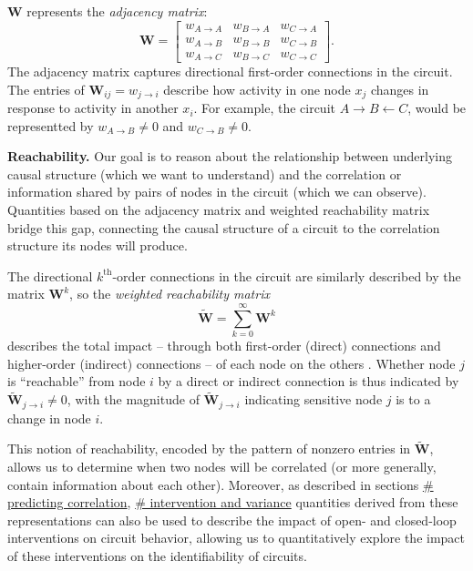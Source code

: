 \documentclass{article}
\begin{document}
\(\mathbf{W}\) represents the \emph{adjacency matrix}: \[
\mathbf{W} = \begin{bmatrix}
    w_{A→A} & w_{B→A} & w_{C→A} \\
    w_{A→B} & w_{B→B} & w_{C→B} \\
    w_{A→C} & w_{B→C} & w_{C→C}
\end{bmatrix}.
\] The adjacency matrix captures directional first-order connections in the circuit. The entries of \(\mathbf{W}_{ij} = w_{j→i}\) describe how activity in one node \(x_j\) changes in response to activity in another
\(x_i\). For example, the circuit \(A \rightarrow B \leftarrow C\), would be representted by \(w_{A→B} \neq 0\) and \(w_{C→B} \neq 0\).

\textbf{Reachability.} Our goal is to reason about the relationship between underlying causal structure (which we want to understand) and the correlation or information shared by pairs of nodes in the circuit
(which we can observe). Quantities based on the adjacency matrix and weighted reachability matrix bridge this gap, connecting the causal structure of a circuit to the correlation structure its nodes will produce.

The directional \(k^{\mathrm{th}}\)-order connections in the circuit are similarly described by the matrix \(\mathbf{W}^k\), so the
\emph{weighted reachability matrix} \[
    \mathbf{\widetilde{W}} = \sum_{k=0}^{\infty} \mathbf{W}^k
\] describes the total impact -- through both first-order (direct)
connections and higher-order (indirect) connections -- of each node on the others \autocite{skiena2011transitive}. Whether node \(j\) is
``reachable'' from node \(i\) by a direct or indirect connection is thus indicated by \(\mathbf{\widetilde{W}}_{j→i} \neq 0\), with the magnitude of \(\mathbf{\widetilde{W}}_{j→i}\) indicating sensitive node \(j\) is to a change in node \(i\).

This notion of reachability, encoded by the pattern of nonzero entries in \(\mathbf{\widetilde{W}}\), allows us to determine when two nodes will be correlated (or more generally, contain information about each other). Moreover, as described in sections
\protect\hyperlink{sec:methods-predict-corr}{\# predicting correlation},
\protect\hyperlink{sec:methods-intervention-var}{\# intervention and variance} quantities derived from these representations can also be used to describe the impact of open- and closed-loop interventions on circuit behavior, allowing us to quantitatively explore the impact of these interventions on the identifiability of circuits.
\end{document}
